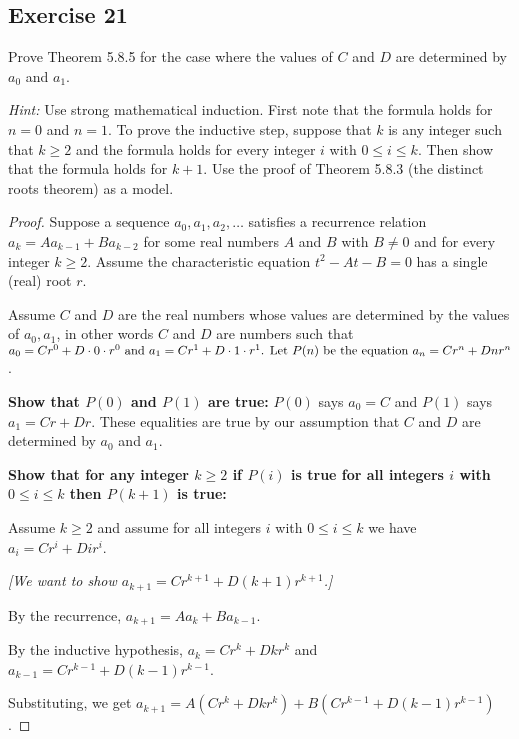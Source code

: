 \documentclass[14pt]{extarticle}
\begin{document}
\subsection{Exercise 21}
Prove Theorem 5.8.5 for the case where the values of $C$ and $D$ are determined by $a_0$ and $a_1$.

    {\it Hint:} Use strong mathematical induction. First note that the formula holds for \(n = 0\) and \(n = 1\). To
prove the inductive step, suppose that $k$ is any integer such that \(k \geq 2\) and the formula holds for every
integer $i$ with \(0 \leq i \leq k\). Then show that the formula holds for $k + 1$. Use the proof of Theorem 5.8.3
(the distinct roots theorem) as a model.

\begin{proof}
    Suppose a sequence \(a_0, a_1, a_2, \ldots\) satisfies a recurrence relation \(a_k = Aa_{k-1} + Ba_{k-2}\) for some
    real numbers $A$ and $B$ with \(B \neq 0\) and for every integer \(k \geq 2\). Assume the characteristic equation
    \(t^2 - At - B = 0\) has a single (real) root $r$.

    Assume $C$ and $D$ are the real numbers whose values are
    determined by the values of $a_0, a_1$, in other words $C$
    and $D$ are numbers such that \(a_0 = Cr^0 + D \cdot 0 \cdot r^0$ and $a_1 = Cr^1 + D \cdot 1 \cdot r^1$.

        Let $P(n)$ be the equation \(a_n = Cr^n + Dnr^n\).

            {\bf Show that $P(0)$ and $P(1)$ are true:} $P(0)$ says \(a_0 = C\) and $P(1)$ says \(a_1 = Cr + Dr\). These
        equalities are true by our assumption that $C$ and $D$ are determined by $a_0$ and $a_1$.

            {\bf Show that for any integer \(k \geq 2\) if $P(i)$ is true for all integers $i$ with \(0 \leq i \leq k\) then
                $P(k+1)$ is true:}

        Assume \(k \geq 2\) and assume for all integers $i$ with \(0 \leq i \leq k\) we have \(a_i = Cr^i + Dir^i\).

            {\it [We want to show \(a_{k+1} = Cr^{k+1} + D(k+1)r^{k+1}\).]}

        By the recurrence, \(a_{k+1} = Aa_k + Ba_{k-1}\).

        By the inductive hypothesis, \(a_k = Cr^k + Dkr^k\) and \(a_{k-1} = Cr^{k-1} + D(k-1)r^{k-1}\).

        Substituting, we get \(a_{k+1} = A(Cr^k + Dkr^k) + B(Cr^{k-1} + D(k-1)r^{k-1})\).


\end{proof}
\end{document}
